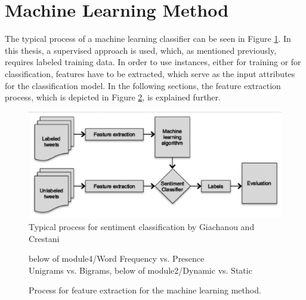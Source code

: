 \section{Machine Learning Method}
The typical process of a machine learning classifier can be seen in Figure \ref{fig:ml_approach}. In this thesis, a supervised approach is used, which, as mentioned previously, requires labeled training data. In order to use instances, either for training or for classification, features have to be extracted, which serve as the input attributes for the classification model. In the following sections, the feature extraction process, which is depicted in Figure \ref{fig:ml_process}, is explained further.
\begin{figure}
    \centering
    \includegraphics[scale=0.5]{Images/ML_approach.png}
    \caption{Typical process for sentiment classification by Giachanou and Crestani \cite[p.~28:3]{DBLP:journals/csur/GiachanouC16}}
    \label{fig:ml_approach}
\end{figure}


\begin{figure}
    \centering

    {below of module4/Word Frequency vs. Presence \\ Unigrams vs. Bigrams, below of module2/Dynamic vs. Static} 

    \vspace{25mm}

   \caption{Process for feature extraction for the machine learning method.}
    \label{fig:ml_process}
\end{figure}

